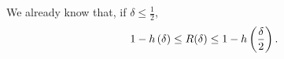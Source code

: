 We already know that, if $\delta \leq \frac{1}{2}$,
\begin{equation*}
	1 - h\left({\delta}\right) \le R(\delta) \le 1 - h\left({\frac{\delta}{2}}\right).
\end{equation*}


